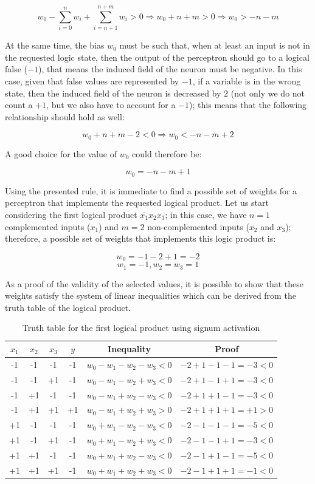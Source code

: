\documentclass[letterpaper,headings=standardclasses]{scrartcl}
\begin{document}
$$ w_0 - \sum_{i = 0}^{n} w_i + \sum_{i = n+1}^{n+m} w_i > 0 \Rightarrow w_0 + n + m > 0 \Rightarrow w_0 > - n - m $$

At the same time, the bias $w_0$ must be such that, when at least an input is not in the requested logic state, then the output of the perceptron should go to a logical false ($-1$), that means the induced field of the neuron must be negative. In this case, given that false values are represented by $-1$, if a variable is in the wrong state, then the induced field of the neuron is decreased by $2$ (not only we do not count a $+1$, but we also have to account for a $-1$); this means that the following relationship should hold as well:

$$ w_0 + n + m - 2 < 0 \Rightarrow w_0 < - n - m  + 2$$

A good choice for the value of $w_0$ could therefore be:

$$ w_0 = - n - m + 1 $$

Using the presented rule, it is immediate to find a possible set of weights for a perceptron that implements the requested logical product. Let us start considering the first logical product $\bar{x_1} x_2 x_3$; in this case, we have $n=1$ complemented inputs ($x_1$) and $m=2$ non-complemented inputs ($x_2$ and $x_3$); therefore, a possible set of weights that implements this logic product is:

$$ w_0 = -1 -2 + 1 = -2 $$
$$ w_1 = -1, w_2 = w_3 = 1 $$

As a proof of the validity of the selected values, it is possible to show that these weights satisfy the system of linear inequalities which can be derived from the truth table of the logical product.

\begin{table}[h]
\centering
\begin{tabular}{|c|c|c|c|c|c|}
\hline
$x_1$ & $x_2$ & $x_3$ & $y$ & Inequality & Proof \\ \hline
-1    & -1    & -1    & -1  & $w_0-w_1-w_2-w_3<0$ & $-2+1-1-1=-3<0$ \\ \hline
-1    & -1    & +1    & -1  & $w_0-w_1-w_2+w_3<0$ & $-2+1-1+1=-3<0$ \\ \hline
-1    & +1    & -1    & -1  & $w_0-w_1+w_2-w_3<0$ & $-2+1+1-1=-3<0$ \\ \hline
-1    & +1    & +1    & +1  & $w_0-w_1+w_2+w_3>0$ & $-2+1+1+1=+1>0$ \\ \hline
+1    & -1    & -1    & -1  & $w_0+w_1-w_2-w_3<0$ & $-2-1-1-1=-5<0$ \\ \hline
+1    & -1    & +1    & -1  & $w_0+w_1-w_2+w_3<0$ & $-2-1-1+1=-3<0$ \\ \hline
+1    & +1    & -1    & -1  & $w_0+w_1+w_2-w_3<0$ & $-2-1+1-1=-5<0$ \\ \hline
+1    & +1    & +1    & -1  & $w_0+w_1+w_2+w_3<0$ & $-2-1+1+1=-1<0$ \\ \hline
\end{tabular}
\caption{Truth table for the first logical product using signum activation}
\label{truth_prod1}
\end{table}
\end{document}
